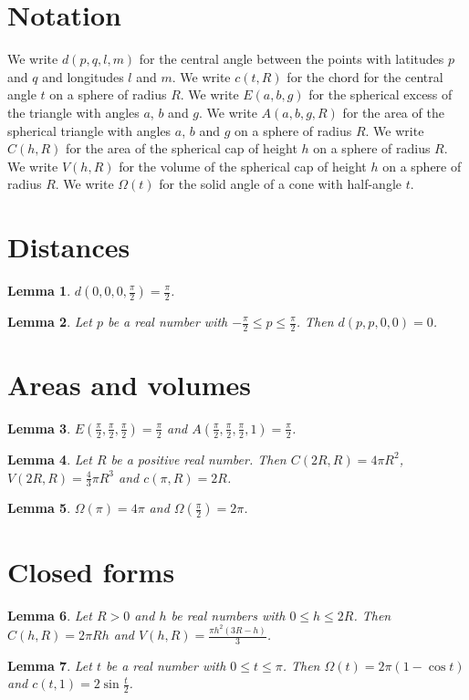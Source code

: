\documentclass{article}
\newtheorem{lemma}{Lemma}
\begin{document}
\section{Notation}

We write $d(p,q,l,m)$ for the central angle between the points with latitudes $p$ and $q$ and longitudes $l$ and $m$.
We write $c(t,R)$ for the chord for the central angle $t$ on a sphere of radius $R$.
We write $E(a,b,g)$ for the spherical excess of the triangle with angles $a$, $b$ and $g$.
We write $A(a,b,g,R)$ for the area of the spherical triangle with angles $a$, $b$ and $g$ on a sphere of radius $R$.
We write $C(h,R)$ for the area of the spherical cap of height $h$ on a sphere of radius $R$.
We write $V(h,R)$ for the volume of the spherical cap of height $h$ on a sphere of radius $R$.
We write $\Omega(t)$ for the solid angle of a cone with half-angle $t$.

\section{Distances}

\begin{lemma}\label{quarter}
$d(0,0,0,\frac{\pi}{2})=\frac{\pi}{2}$.
\end{lemma}

\begin{lemma}\label{same}
Let $p$ be a real number with $-\frac{\pi}{2}\le p\le\frac{\pi}{2}$. Then $d(p,p,0,0)=0$.
\end{lemma}

\section{Areas and volumes}

\begin{lemma}\label{octant}
$E(\frac{\pi}{2},\frac{\pi}{2},\frac{\pi}{2})=\frac{\pi}{2}$ and $A(\frac{\pi}{2},\frac{\pi}{2},\frac{\pi}{2},1)=\frac{\pi}{2}$.
\end{lemma}

\begin{lemma}\label{caps}
Let $R$ be a positive real number. Then $C(2R,R)=4\pi R^2$, $V(2R,R)=\frac43\pi R^3$ and $c(\pi,R)=2R$.
\end{lemma}

\begin{lemma}\label{solid}
$\Omega(\pi)=4\pi$ and $\Omega(\frac{\pi}{2})=2\pi$.
\end{lemma}

\section{Closed forms}

\begin{lemma}\label{closed}
Let $R>0$ and $h$ be real numbers with $0\le h\le2R$. Then $C(h,R)=2\pi Rh$ and $V(h,R)=\frac{\pi h^2(3R-h)}{3}$.
\end{lemma}

\begin{lemma}\label{solid-closed}
Let $t$ be a real number with $0\le t\le\pi$. Then $\Omega(t)=2\pi(1-\cos t)$ and $c(t,1)=2\sin\frac{t}{2}$.
\end{lemma}
\end{document}
